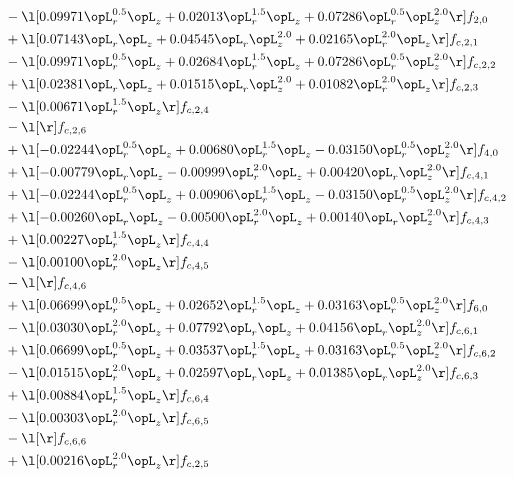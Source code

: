 \begin{alignat}{2}
& - \l[  0.09971 \opL_r^{0.5} \opL_z +  0.02013 \opL_r^{1.5} \opL_z +  0.07286 \opL_r^{0.5} \opL_z^{2.0}  \r] f_{2,0} \nonumber \\ 
& + \l[  0.07143 \opL_r \opL_z +  0.04545 \opL_r \opL_z^{2.0} +  0.02165 \opL_r^{2.0} \opL_z  \r] f_{c,2,1} \nonumber \\ 
& - \l[  0.09971 \opL_r^{0.5} \opL_z +  0.02684 \opL_r^{1.5} \opL_z +  0.07286 \opL_r^{0.5} \opL_z^{2.0}  \r] f_{c,2,2} \nonumber \\ 
& + \l[  0.02381 \opL_r \opL_z +  0.01515 \opL_r \opL_z^{2.0} +  0.01082 \opL_r^{2.0} \opL_z  \r] f_{c,2,3} \nonumber \\ 
& - \l[  0.00671 \opL_r^{1.5} \opL_z  \r] f_{c,2,4} \nonumber \\ 
& - \l[  \r] f_{c,2,6} \nonumber \\ 
& + \l[  -0.02244 \opL_r^{0.5} \opL_z +  0.00680 \opL_r^{1.5} \opL_z   -0.03150 \opL_r^{0.5} \opL_z^{2.0}  \r] f_{4,0} \nonumber \\ 
& + \l[  -0.00779 \opL_r \opL_z   -0.00999 \opL_r^{2.0} \opL_z +  0.00420 \opL_r \opL_z^{2.0}  \r] f_{c,4,1} \nonumber \\ 
& + \l[  -0.02244 \opL_r^{0.5} \opL_z +  0.00906 \opL_r^{1.5} \opL_z   -0.03150 \opL_r^{0.5} \opL_z^{2.0}  \r] f_{c,4,2} \nonumber \\ 
& + \l[  -0.00260 \opL_r \opL_z   -0.00500 \opL_r^{2.0} \opL_z +  0.00140 \opL_r \opL_z^{2.0}  \r] f_{c,4,3} \nonumber \\ 
& + \l[  0.00227 \opL_r^{1.5} \opL_z  \r] f_{c,4,4} \nonumber \\ 
& - \l[  0.00100 \opL_r^{2.0} \opL_z  \r] f_{c,4,5} \nonumber \\ 
& - \l[  \r] f_{c,4,6} \nonumber \\ 
& + \l[  0.06699 \opL_r^{0.5} \opL_z +  0.02652 \opL_r^{1.5} \opL_z +  0.03163 \opL_r^{0.5} \opL_z^{2.0}  \r] f_{6,0} \nonumber \\ 
& - \l[  0.03030 \opL_r^{2.0} \opL_z +  0.07792 \opL_r \opL_z +  0.04156 \opL_r \opL_z^{2.0}  \r] f_{c,6,1} \nonumber \\ 
& + \l[  0.06699 \opL_r^{0.5} \opL_z +  0.03537 \opL_r^{1.5} \opL_z +  0.03163 \opL_r^{0.5} \opL_z^{2.0}  \r] f_{c,6,2} \nonumber \\ 
& - \l[  0.01515 \opL_r^{2.0} \opL_z +  0.02597 \opL_r \opL_z +  0.01385 \opL_r \opL_z^{2.0}  \r] f_{c,6,3} \nonumber \\ 
& + \l[  0.00884 \opL_r^{1.5} \opL_z  \r] f_{c,6,4} \nonumber \\ 
& - \l[  0.00303 \opL_r^{2.0} \opL_z  \r] f_{c,6,5} \nonumber \\ 
& - \l[  \r] f_{c,6,6} \nonumber \\ 
& + \l[  0.00216 \opL_r^{2.0} \opL_z  \r] f_{c,2,5} \nonumber \\ 
\end{alignat} 


